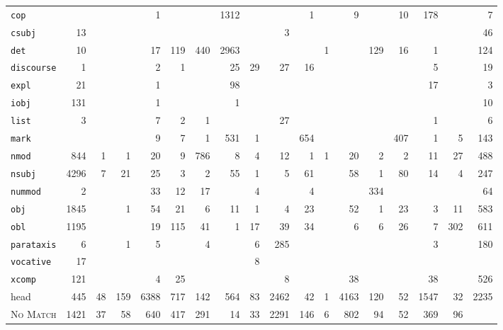 \documentclass[extrafontsizes,60pt,twocolumn]{memoir}
\begin{document}
\begin{minipage}{.5\columnwidth}
\begin{center}
{\begin{tabular}{lRRRRRRRRRRRRRRRR|R}
\texttt{cop} &  &  &  & 1 &  &  & 1312 &  &  & 1 &  & 9 &  & 10 & 178 &  & 7 \\
\texttt{csubj} & 13 &  &  &  &  &  &  &  & 3 &  &  &  &  &  &  &  & 46 \\
\texttt{det} & 10 &  &  & 17 & 119 & 440 & 2963 &  &  &  & 1 &  & 129 & 16 & 1 &  & 124 \\
\texttt{discourse} & 1 &  &  & 2 & 1 &  & 25 & 29 & 27 & 16 &  &  &  &  & 5 &  & 19 \\
\texttt{expl} & 21 &  &  & 1 &  &  & 98 &  &  &  &  &  &  &  & 17 &  & 3 \\
\texttt{iobj} & 131 &  &  & 1 &  &  & 1 &  &  &  &  &  &  &  &  &  & 10 \\
\texttt{list} & 3 &  &  & 7 & 2 & 1 &  &  & 27 &  &  &  &  &  & 1 &  & 6 \\
\texttt{mark} &  &  &  & 9 & 7 & 1 & 531 & 1 &  & 654 &  &  &  & 407 & 1 & 5 & 143 \\
\texttt{nmod} & 844 & 1 & 1 & 20 & 9 & 786 & 8 & 4 & 12 & 1 & 1 & 20 & 2 & 2 & 11 & 27 & 488 \\
\texttt{nsubj} & 4296 & 7 & 21 & 25 & 3 & 2 & 55 & 1 & 5 & 61 &  & 58 & 1 & 80 & 14 & 4 & 247 \\
\texttt{nummod} & 2 &  &  & 33 & 12 & 17 &  & 4 &  & 4 &  &  & 334 &  &  &  & 64 \\
\texttt{obj} & 1845 &  & 1 & 54 & 21 & 6 & 11 & 1 & 4 & 23 &  & 52 & 1 & 23 & 3 & 11 & 583 \\
\texttt{obl} & 1195 &  &  & 19 & 115 & 41 & 1 & 17 & 39 & 34 &  & 6 & 6 & 26 & 7 & 302 & 611 \\
\texttt{parataxis} & 6 &  & 1 & 5 &  & 4 &  & 6 & 285 &  &  &  &  &  & 3 &  & 180 \\
\texttt{vocative} & 17 &  &  &  &  &  &  & 8 &  &  &  &  &  &  &  &  &  \\
\texttt{xcomp} & 121 &  &  & 4 & 25 &  &  &  & 8 &  &  & 38 &  &  & 38 &  & 526 \\
\hline
head & 445 & 48 & 159 & 6388 & 717 & 142 & 564 & 83 & 2462 & 42 & 1 & 4163 & 120 & 52 & 1547 & 32 & 2235 \\
\hline
\textsc{No Match} & 1421 & 37 & 58 & 640 & 417 & 291 & 14 & 33 & 2291 & 146 & 6 & 802 & 94 & 52 & 369 & 96 & 
\end{tabular}}
\end{center}
\end{minipage}
\end{document}
